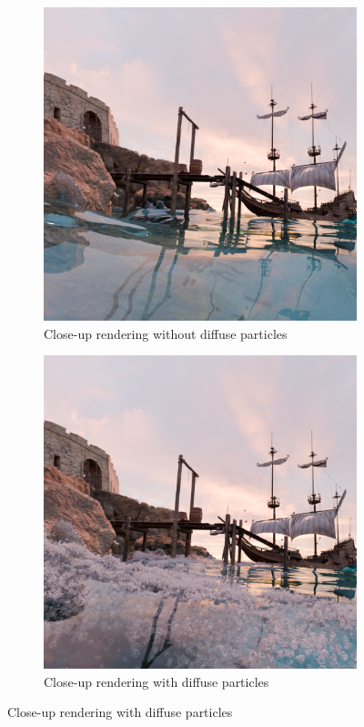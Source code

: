 \documentclass[oneside, a4paper]{book}
\begin{document}
  \begin{figure}
    \centering
    \begin{subfigure}[t][0.5\textwidth]{0.5\textwidth}
      \includegraphics[width=\textwidth]{images/foam-side-without.png}
      \caption{Close-up rendering without diffuse particles}
      \label{fig:foam-a}
    \end{subfigure}%
    \begin{subfigure}[t][0.5\textwidth]{0.5\textwidth}
      \includegraphics[width=\textwidth]{images/foam-side-with.png}
      \caption{Close-up rendering with diffuse particles}
      \label{fig:foam-b}
    \end{subfigure}\vspace{1cm}



\end{figure}
\end{document}
